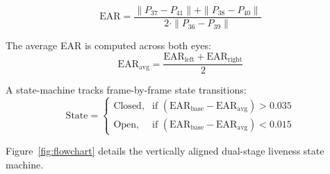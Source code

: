 \documentclass[12pt,a4paper,oneside]{article}
\begin{document}
\begin{equation}
\text{EAR} = \frac{\|P_{37} - P_{41}\| + \|P_{38} - P_{40}\|}{2 \cdot \|P_{36} - P_{39}\|}
\end{equation}

The average EAR is computed across both eyes:
\begin{equation}
\text{EAR}_{\text{avg}} = \frac{\text{EAR}_{\text{left}} + \text{EAR}_{\text{right}}}{2}
\end{equation}

A state-machine tracks frame-by-frame state transitions:
\begin{equation}
\text{State} = 
\begin{cases}
\text{Closed}, & \text{if } (\text{EAR}_{\text{base}} - \text{EAR}_{\text{avg}}) > 0.035 \\
\text{Open}, & \text{if } (\text{EAR}_{\text{base}} - \text{EAR}_{\text{avg}}) < 0.015
\end{cases}
\end{equation}

Figure~\ref{fig:flowchart} details the vertically aligned dual-stage liveness state machine.
\end{document}
